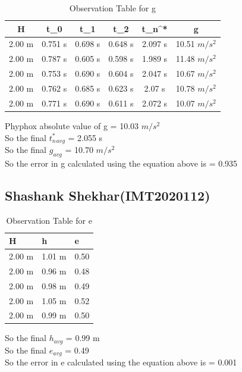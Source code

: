 \documentclass[11pt]{scrartcl} %
\begin{document}
\begin{table}[h]
\centering
\begin{tabular}{||c c c c c c||} 
\toprule
 \hline
 H & t_0 & t_1 & t_2 & t_n^* & g \\ [0.5ex] 
 \midrule
 \hline\hline
 2.00 m & 0.751 s & 0.698 s  & 0.648 s & 2.097 s & 10.51 $m/s^2$  \\ 
 \hline
 2.00 m & 0.787 s & 0.605 s & 0.598 s & 1.989 s & 11.48 $m/s^2$  \\
 \hline
 2.00 m & 0.753 s & 0.690 s & 0.604 s & 2.047 s  & 10.67 $m/s^2$   \\
 \hline
 2.00 m & 0.762 s & 0.685 s & 0.623 s & 2.07 s  & 10.78 $m/s^2$   \\
 \hline
 2.00 m & 0.771 s & 0.690 s & 0.611 s & 2.072 s  & 10.07 $m/s^2$  \\ [1ex]
 \bottomrule
 \hline
\end{tabular}
\caption{Observation Table for g}
\end{table}
Phyphox absolute value of g = 10.03 $m/s^2$\\
So the final $t_n^*_{avg}$ = 2.055 s\\
So the final $g_{avg}$ = 10.70 $m/s^2$\\
So the error in g calculated using the equation above is  = 0.935 \\

\newpage
\subsection{Shashank Shekhar(IMT2020112)}

\begin{table}[h] %
	\centering %
	\begin{tabular}{l l l}
		\toprule
		\textbf{H} & \textbf{h} & \textbf{e} \\
		\midrule
		2.00 m & 1.01 m & 0.50\\
        2.00 m & 0.96 m  & 0.48\\
        2.00 m & 0.98 m  & 0.49\\
        2.00 m & 1.05 m & 0.52 \\
        2.00 m & 0.99 m & 0.50 \\
		\bottomrule
	\end{tabular}
	\caption{Observation Table for e}
\end{table}
So the final $h_{avg}$ = 0.99 m\\
So the final $e_{avg}$ = 0.49\\
So the error in e calculated using the equation above is  = 0.001
\end{document}
